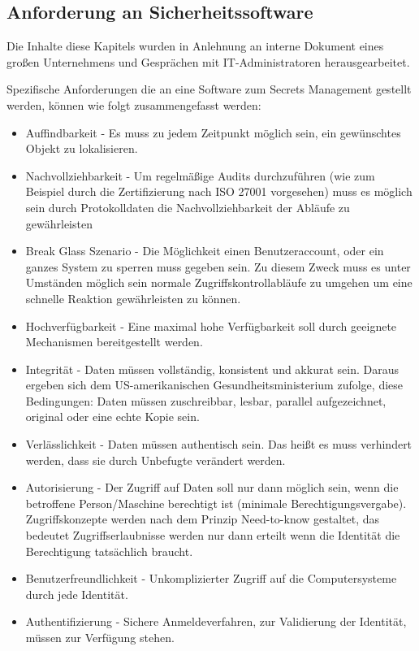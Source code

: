 \documentclass[
book,
a4paper,   
titlepage,  
halfparskip,
12pt        
]{scrartcl}
\begin{document}
\begin{onehalfspacing}
\subsection{Anforderung an Sicherheitssoftware}
\label{subsubsec:anforderung}
Die Inhalte diese Kapitels wurden in Anlehnung an interne Dokument eines großen Unternehmens und Gesprächen mit \ac{IT}-Administratoren herausgearbeitet.

Spezifische Anforderungen die an eine Software zum Secrets Management gestellt werden, können wie folgt zusammengefasst werden:

\begin{itemize}
  \item Auffindbarkeit - Es muss zu jedem Zeitpunkt möglich sein, ein gewünschtes Objekt zu lokalisieren.\cite[S. 3]{kerberos2}
  \item Nachvollziehbarkeit - Um regelmäßige Audits durchzuführen (wie zum Beispiel durch die Zertifizierung nach ISO 27001 vorgesehen\cite[S. 17]{risiko}) muss es möglich sein durch Protokolldaten die Nachvollziehbarkeit der Abläufe zu gewährleisten  
  \item Break Glass Szenario - Die Möglichkeit einen Benutzeraccount, oder ein ganzes System zu sperren muss gegeben sein. Zu diesem Zweck muss es unter Umständen möglich sein normale Zugriffskontrollabläufe zu umgehen um eine schnelle Reaktion gewährleisten zu können.\cite{break}
  \item Hochverfügbarkeit - Eine maximal hohe Verfügbarkeit soll durch geeignete Mechanismen bereitgestellt werden.\cite[S. 3]{ha} 
  \item Integrität - Daten müssen vollständig, konsistent und akkurat sein. Daraus ergeben sich dem US-amerikanischen Gesundheitsministerium \cite[S. 2]{health} zufolge, diese Bedingungen: Daten müssen zuschreibbar, lesbar, parallel aufgezeichnet, original oder eine echte Kopie sein.
  \item Verlässlichkeit - Daten müssen authentisch sein. Das heißt es muss verhindert werden, dass sie durch Unbefugte verändert werden.
  \item Autorisierung - Der Zugriff auf Daten soll nur dann möglich sein, wenn die betroffene Person/Maschine berechtigt ist (minimale Berechtigungsvergabe). Zugriffskonzepte werden nach dem Prinzip Need-to-know gestaltet, das bedeutet Zugriffserlaubnisse werden nur dann erteilt wenn die Identität die Berechtigung tatsächlich braucht.
  \item Benutzerfreundlichkeit - Unkomplizierter Zugriff auf die Computersysteme durch jede Identität.
  \item Authentifizierung - Sichere Anmeldeverfahren, zur Validierung der Identität,  müssen zur Verfügung stehen.
\end{itemize}


\end{onehalfspacing}
\end{document}
